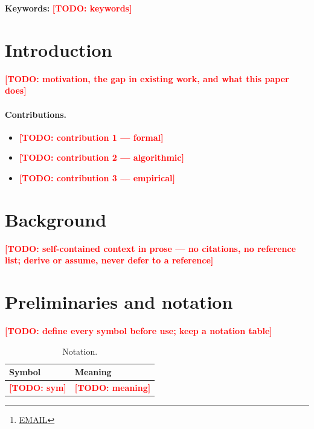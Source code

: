 \documentclass[11pt,a4paper]{article}
\title{\TODO{title}}
\author{AUTHOR\thanks{\href{mailto:EMAIL}{EMAIL}}}
\date{\today}
\theoremstyle{plain}
\theoremstyle{definition}
\theoremstyle{remark}
\newcommand{\TODO}[1]{\textcolor{red}{\textbf{[TODO: #1]}}}
\begin{document}
\maketitle

\begin{abstract}
\TODO{abstract: problem, method, main formal result, main empirical result, significance}
\end{abstract}

\noindent\textbf{Keywords:} \TODO{keywords}

\section{Introduction}
\label{sec:intro}
\TODO{motivation, the gap in existing work, and what this paper does}

\paragraph{Contributions.}
\begin{itemize}
  \item \TODO{contribution 1 — formal}
  \item \TODO{contribution 2 — algorithmic}
  \item \TODO{contribution 3 — empirical}
\end{itemize}

\section{Background}
\label{sec:background}
\TODO{self-contained context in prose — no citations, no reference list; derive or assume, never defer to a reference}

\section{Preliminaries and notation}
\label{sec:prelim}
\TODO{define every symbol before use; keep a notation table}

\begin{table}[t]
  \centering
  \caption{Notation.}
  \label{tab:notation}
  \begin{tabular}{ll}
    \toprule
    Symbol & Meaning \\
    \midrule
    \TODO{sym} & \TODO{meaning} \\
    \bottomrule
  \end{tabular}
\end{table}
\end{document}

